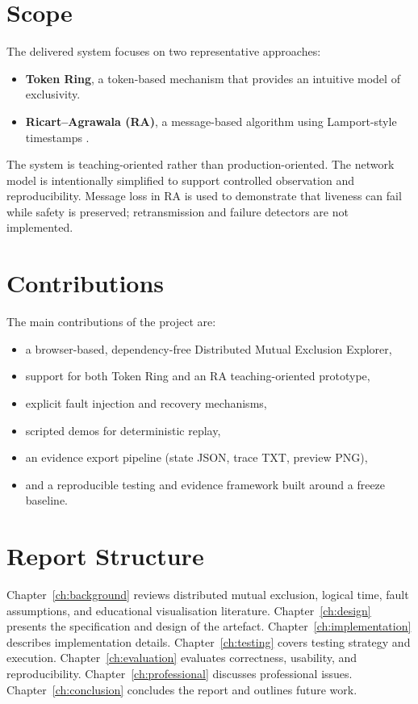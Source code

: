 \section{Scope}
The delivered system focuses on two representative approaches:
\begin{itemize}
  \item \textbf{Token Ring}, a token-based mechanism that provides an intuitive model of exclusivity.
  \item \textbf{Ricart--Agrawala (RA)}, a message-based algorithm using Lamport-style timestamps \cite{ricart1981optimal,lamport1978time}.
\end{itemize}

The system is teaching-oriented rather than production-oriented. The network model is intentionally simplified to support controlled observation and reproducibility. Message loss in RA is used to demonstrate that liveness can fail while safety is preserved; retransmission and failure detectors are not implemented.

\section{Contributions}
The main contributions of the project are:
\begin{itemize}
  \item a browser-based, dependency-free Distributed Mutual Exclusion Explorer,
  \item support for both Token Ring and an RA teaching-oriented prototype,
  \item explicit fault injection and recovery mechanisms,
  \item scripted demos for deterministic replay,
  \item an evidence export pipeline (state JSON, trace TXT, preview PNG),
  \item and a reproducible testing and evidence framework built around a freeze baseline.
\end{itemize}

\section{Report Structure}
Chapter~\ref{ch:background} reviews distributed mutual exclusion, logical time, fault assumptions, and educational visualisation literature.
Chapter~\ref{ch:design} presents the specification and design of the artefact.
Chapter~\ref{ch:implementation} describes implementation details.
Chapter~\ref{ch:testing} covers testing strategy and execution.
Chapter~\ref{ch:evaluation} evaluates correctness, usability, and reproducibility.
Chapter~\ref{ch:professional} discusses professional issues.
Chapter~\ref{ch:conclusion} concludes the report and outlines future work.